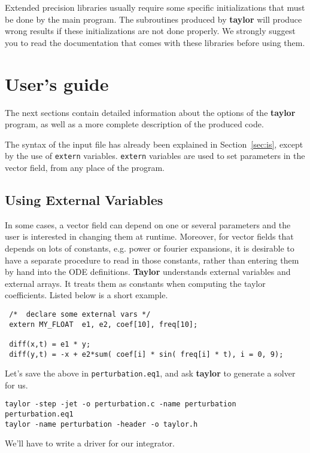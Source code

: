 \documentclass{article}
\begin{document}
\bigskip

 Extended precision libraries usually
require some specific initializations that must be done by the main
program. The subroutines produced by {\bf taylor} will produce wrong
results if these initializations are not done properly. We strongly
suggest you to read the documentation that comes with these libraries
before using them.


\section{User's guide}
The next sections contain detailed information about the options of
the {\bf taylor} program, as well as a more complete description of
the produced code.

The syntax of the input file has already been explained in
Section~\ref{sec:is}, except by the use of {\tt extern}
variables. {\tt extern} variables are used to set parameters in the
vector field, from any place of the program.

\subsection{Using External Variables}
In some cases, a vector field can depend on one or several parameters
and the user is interested in changing them at runtime. Moreover,
for vector fields that depends on lots of constants,
e.g. power or fourier expansions,
it is desirable to have a separate procedure to read in those
constants, rather than entering them by hand into
the ODE definitions.  {\bf Taylor} understands
external variables and external arrays. 
It treats them as constants when computing the taylor
coefficients.  Listed below is a short example.

\begin{verbatim}
 /*  declare some external vars */
 extern MY_FLOAT  e1, e2, coef[10], freq[10];

 diff(x,t) = e1 * y;
 diff(y,t) = -x + e2*sum( coef[i] * sin( freq[i] * t), i = 0, 9);

\end{verbatim}
Let's save the above in \verb+perturbation.eq1+, and ask {\bf
taylor} to generate a solver for us. 
\begin{verbatim}
taylor -step -jet -o perturbation.c -name perturbation perturbation.eq1
taylor -name perturbation -header -o taylor.h    
\end{verbatim}
We'll have to write a driver for our integrator. 
\end{document}
